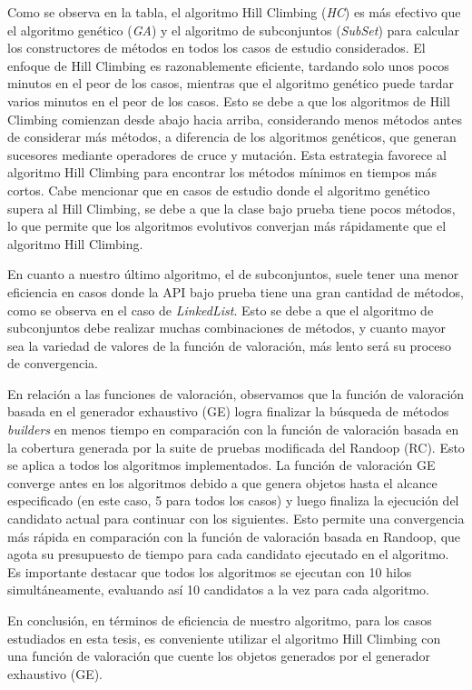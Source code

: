 Como se observa en la tabla, el algoritmo Hill Climbing (\emph{HC}) es más efectivo que el algoritmo genético (\emph{GA}) y el algoritmo de subconjuntos (\emph{SubSet}) para calcular los constructores de métodos en todos los casos de estudio considerados. El enfoque de Hill Climbing es razonablemente eficiente, tardando solo unos pocos minutos en el peor de los casos, mientras que el algoritmo genético puede tardar varios minutos en el peor de los casos. Esto se debe a que los algoritmos de Hill Climbing comienzan desde abajo hacia arriba, considerando menos métodos antes de considerar más métodos, a diferencia de los algoritmos genéticos, que generan sucesores mediante operadores de cruce y mutación. Esta estrategia favorece al algoritmo Hill Climbing para encontrar los métodos mínimos en tiempos más cortos. Cabe mencionar que en casos de estudio donde el algoritmo genético supera al Hill Climbing, se debe a que la clase bajo prueba tiene pocos métodos, lo que permite que los algoritmos evolutivos converjan más rápidamente que el algoritmo Hill Climbing.

En cuanto a nuestro último algoritmo, el de subconjuntos, suele tener una menor eficiencia en casos donde la API bajo prueba tiene una gran cantidad de métodos, como se observa en el caso de \emph{LinkedList}. Esto se debe a que el algoritmo de subconjuntos debe realizar muchas combinaciones de métodos, y cuanto mayor sea la variedad de valores de la función de valoración, más lento será su proceso de convergencia.

En relación a las funciones de valoración, observamos que la función de valoración basada en el generador exhaustivo (GE) logra finalizar la búsqueda de métodos \emph{builders} en menos tiempo en comparación con la función de valoración basada en la cobertura generada por la suite de pruebas modificada del Randoop (RC). Esto se aplica a todos los algoritmos implementados. La función de valoración GE converge antes en los algoritmos debido a que genera objetos hasta el alcance especificado (en este caso, 5 para todos los casos) y luego finaliza la ejecución del candidato actual para continuar con los siguientes. Esto permite una convergencia más rápida en comparación con la función de valoración basada en Randoop, que agota su presupuesto de tiempo para cada candidato ejecutado en el algoritmo. Es importante destacar que todos los algoritmos se ejecutan con 10 hilos simultáneamente, evaluando así 10 candidatos a la vez para cada algoritmo.

En conclusión, en términos de eficiencia de nuestro algoritmo, para los casos estudiados en esta tesis, es conveniente utilizar el algoritmo Hill Climbing con una función de valoración que cuente los objetos generados por el generador exhaustivo (GE).

